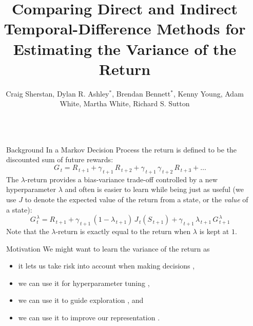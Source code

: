 \documentclass[final]{beamer}
\title{\LARGE{Comparing Direct and Indirect Temporal-Difference Methods for Estimating the Variance of the Return}}
\author{Craig Sherstan, Dylan R. Ashley$^{*}$, Brendan Bennett$^{*}$, Kenny Young, Adam White, Martha White, Richard S. Sutton}
\institute[shortinst]{Reinforcement Learning and Artificial Intelligence Laboratory, University of Alberta}
\newlength{\sepwidth}
\newlength{\colwidth}
\newcommand{\separatorcolumn}{\begin{column}{\sepwidth}\end{column}}
\begin{document}
\begin{frame}[t]
\begin{columns}[t]
\separatorcolumn

\begin{column}{\colwidth}

    \begin{block}{Background}
        In a Markov Decision Process the return is defined to be the discounted sum of future rewards:
        \begin{equation*}
            G_{\,t} = R_{\,t + 1} + \gamma_{\,t + 1} \,R_{\,t + 2} + \gamma_{\,t + 1} \,\gamma_{\,t + 2} \,R_{\,t + 3} + \ldots
        \end{equation*}
        The {$\lambda$}-return provides a bias-variance trade-off controlled by a new hyperparameter $\lambda$ and often is easier to learn while being just as useful (we use $J$ to denote the expected value of the return from a state, or the \textit{value} of a state):
        \begin{equation*}
            G_{\,t}^{\,\lambda} = R_{\,t+1} + \gamma_{\,t + 1} \,(1 - \lambda_{\,t + 1}) \,J_{\,t}(S_{\,t + 1}) + \gamma_{\,t + 1} \,\lambda_{\,t + 1} \,G^{\,\lambda}_{\,t + 1}
        \end{equation*}
        Note that the {$\lambda$}-return is exactly equal to the return when $\lambda$ is kept at $1$.
    \end{block}

    \begin{block}{Motivation}
        We might want to learn the variance of the return as
        \begin{itemize}
            \item it lets us take risk into account when making decisions \cite{tamar2016learning},
            \item we can use it for hyperparameter tuning \cite{white2016greedy},
            \item we can use it to guide exploration \cite{white2014surprise}, and
            \item we can use it to improve our representation \cite{ring1997child}.
        \end{itemize}
    \end{block}


\end{column}
\end{columns}
\end{frame}
\end{document}
